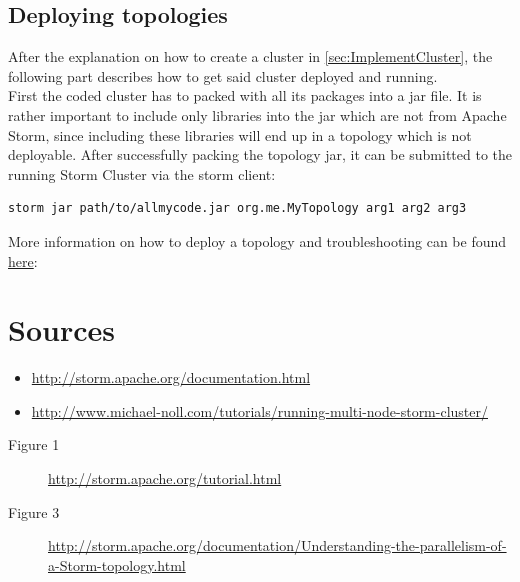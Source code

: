 \documentclass[12pt,a4paper]{article}
\begin{document}
\subsection{Deploying topologies}
After the explanation on how to create a cluster in \ref{sec:ImplementCluster}, the following part describes how to get said cluster deployed and running.\\
First the coded cluster has to packed with all its packages into a jar file. It is rather important to include only libraries into the jar which are not from Apache Storm, since including these libraries will end up in a topology which is not deployable. After successfully packing the topology jar, it can be submitted to the running Storm Cluster via the storm client:
\begin{verbatim}
storm jar path/to/allmycode.jar org.me.MyTopology arg1 arg2 arg3
\end{verbatim}
More information on how to deploy a topology and troubleshooting can be found  \href{http://storm.apache.org/documentation/Running-topologies-on-a-production-cluster.html}{here}:
\section{Sources}
\begin{itemize}
\item \url{http://storm.apache.org/documentation.html}
\item \url{http://www.michael-noll.com/tutorials/running-multi-node-storm-cluster/}
\end{itemize}
\begin{description}
\item[Figure 1] \url{http://storm.apache.org/tutorial.html}
\item[Figure 3] \url{http://storm.apache.org/documentation/Understanding-the-parallelism-of-a-Storm-topology.html}
\end{description}
\end{document}

